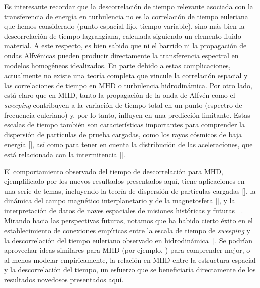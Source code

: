 Es interesante recordar que la descorrelación de tiempo relevante
asociada con la transferencia de energía en turbulencia no es la
correlación de tiempo euleriana que hemos considerado (punto espacial
fijo, tiempo variable), sino más bien la descorrelación de tiempo
lagrangiana, calculada siguiendo un elemento fluido material. A este
respecto, es bien sabido que ni el barrido ni la propagación de ondas
Alfvénicas pueden producir directamente la transferencia espectral en
modelos homogéneos idealizados. En parte debido a estas
complicaciones, actualmente no existe una teoría completa que vincule
la correlación espacial y las correlaciones de tiempo en MHD o
turbulencia hidrodinámica. Por otro lado, está claro que en MHD, tanto
la propagación de la onda de Alfvén como el \textit{sweeping} contribuyen a la
variación de tiempo total en un punto (espectro de frecuencia
euleriano) y, por lo tanto, influyen en una predicción
limitante. Estas escalas de tiempo también son características
importantes para comprender la dispersión de partículas de prueba
cargadas, como los rayos cósmicos de baja energía
[\cite{bieber_proton_1994}], así como para tener en cuenta la
distribución de las aceleraciones, que está relacionada con la
intermitencia [\cite{nelkin_time_1990}].

El comportamiento observado del tiempo de descorrelación para MHD,
ejemplificado por los nuevos resultados presentados aquí, tiene
aplicaciones en una serie de temas, incluyendo la teoría de dispersión
de partículas cargadas [\cite{schlickeiser_cosmic-ray_1993,
  nelkin_time_1990}], la dinámica del campo magnético interplanetario y
de la magnetosfera [\cite{miller_critical_1997}], y la interpretación de
datos de naves espaciales de misiones históricas y futuras
[\cite{matthaeus_ensemble_2016}]. Mirando hacia las perspectivas
futuras, notamos que ha habido cierto éxito en el establecimiento de
conexiones empíricas entre la escala de tiempo de \textit{sweeping} y la
descorrelación del tiempo euleriano observado en hidrodinámica
[\cite{chen_sweeping_1989}]. Se podrían aprovechar ideas similares para
MHD (por ejemplo, \cite{matthaeus_dynamical_1999}) para comprender
mejor, o al menos modelar empíricamente, la relación en MHD entre la
estructura espacial y la descorrelación del tiempo, un esfuerzo que se
beneficiaría directamente de los resultados novedosos presentados
aquí.
